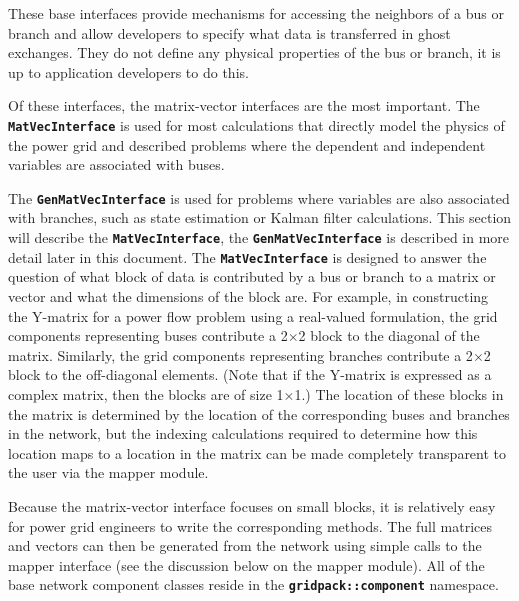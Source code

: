\documentclass[12pt]{report} %
\begin{document}


These base interfaces provide mechanisms for accessing the neighbors of a bus or branch and allow developers to specify what data is transferred in ghost exchanges. They do not define any physical properties of the bus or branch, it is up to application developers to do this.

Of these interfaces, the matrix-vector interfaces are the most important. The \texttt{\textbf{MatVecInterface}} is used for most calculations that directly model the physics of the power grid and described problems where the dependent and independent variables are associated with buses. 

The \texttt{\textbf{GenMatVecInterface}} is used for problems where variables are also associated with branches, such as state estimation or Kalman filter calculations. This section will describe the \texttt{\textbf{MatVecInterface}}, the \texttt{\textbf{GenMatVecInterface}} is described in more detail later in this document. The \texttt{\textbf{MatVecInterface}} is designed to answer the question of what block of data is contributed by a bus or branch to a matrix or vector and what the dimensions of the block are. For example, in constructing the Y-matrix for a power flow problem using a real-valued formulation, the grid components representing buses contribute a 2$\mathrm{\times}$2 block to the diagonal of the matrix. Similarly, the grid components representing branches contribute a 2$\mathrm{\times}$2 block to the off-diagonal elements. (Note that if the Y-matrix is expressed as a complex matrix, then the blocks are of size 1$\mathrm{\times}$1.) The location of these blocks in the matrix is determined by the location of the corresponding buses and branches in the network, but the indexing calculations required to determine how this location maps to a location in the matrix can be made completely transparent to the user via the mapper module. 

Because the matrix-vector interface focuses on small blocks, it is relatively easy for power grid engineers to write the corresponding methods. The full matrices and vectors can then be generated from the network using simple calls to the mapper interface (see the discussion below on the mapper module). All of the base network component classes reside in the \texttt{\textbf{gridpack::component}} namespace.
\end{document}

